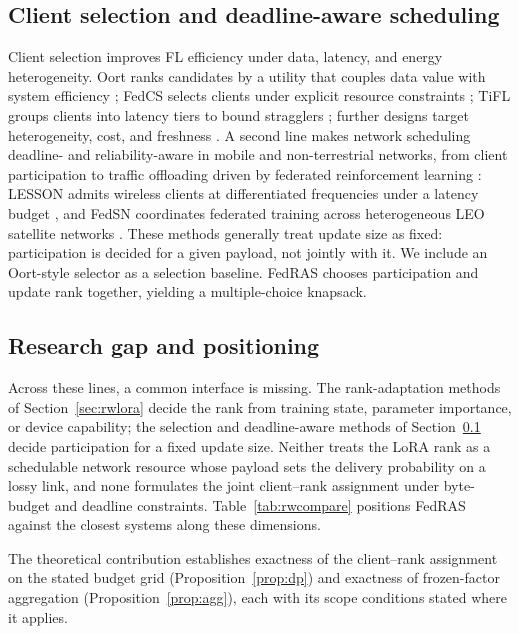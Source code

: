 \documentclass[a4paper,fleqn]{cas-dc}
\begin{document}
\subsection{Client selection and deadline-aware scheduling}
\label{sec:rwselect}
Client selection improves FL efficiency under data, latency, and energy heterogeneity. Oort ranks candidates by a utility that couples data value with system efficiency \cite{oort2021oort}; FedCS selects clients under explicit resource constraints \cite{nishio2019fedcs}; TiFL groups clients into latency tiers to bound stragglers \cite{chai2020tifl}; further designs target heterogeneity, cost, and freshness \cite{chen2024clientselection,dong2024aoi,luo2021costeffective}. A second line makes network scheduling deadline- and reliability-aware in mobile and non-terrestrial networks, from client participation \cite{razmi2022ground,tang2023flsagin,ribero2023intermittent,han2024orchestrating} to traffic offloading driven by federated reinforcement learning \cite{qin2024dfrl}: LESSON admits wireless clients at differentiated frequencies under a latency budget \cite{yu2023lesson}, and FedSN coordinates federated training across heterogeneous LEO satellite networks \cite{lin2025fedsn}. These methods generally treat update size as fixed: participation is decided for a given payload, not jointly with it. We include an Oort-style selector as a selection baseline. FedRAS chooses participation and update rank together, yielding a multiple-choice knapsack.

\subsection{Research gap and positioning}
Across these lines, a common interface is missing. The rank-adaptation methods of Section~\ref{sec:rwlora} decide the rank from training state, parameter importance, or device capability; the selection and deadline-aware methods of Section~\ref{sec:rwselect} decide participation for a fixed update size. Neither treats the LoRA rank as a schedulable network resource whose payload sets the delivery probability on a lossy link, and none formulates the joint client--rank assignment under byte-budget and deadline constraints. Table~\ref{tab:rwcompare} positions FedRAS against the closest systems along these dimensions.

The theoretical contribution establishes exactness of the client--rank assignment on the stated budget grid (Proposition~\ref{prop:dp}) and exactness of frozen-factor aggregation (Proposition~\ref{prop:agg}), each with its scope conditions stated where it applies.
\end{document}
